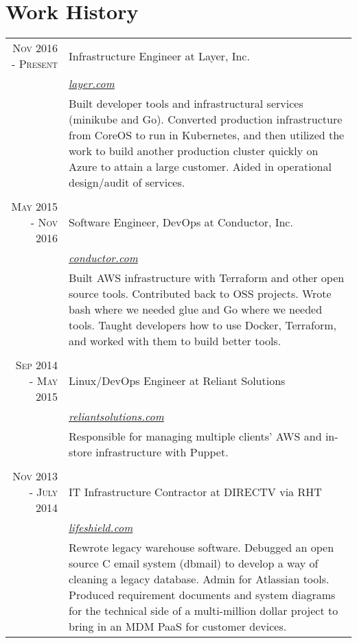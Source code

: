 \documentclass[a4paper, 10pt, onepage]{article} %
\begin{document}
\section{Work History}
\begin{tabular}{r|p{10cm}}
\textsc{Nov 2016 - Present} & {Infrastructure Engineer at Layer, Inc.}\\
&\small\emph{\href{https://layer.com}{layer.com}}\\
&\footnotesize{Built developer tools and infrastructural services (minikube and Go). Converted production infrastructure from CoreOS to run in Kubernetes, and then utilized the work to build another production cluster quickly on Azure to attain a large customer. Aided in operational design/audit of services.}\\

\multicolumn{2}{c}{}\\
\textsc{May 2015 - Nov 2016} & {Software Engineer, DevOps at Conductor, Inc.}\\
&\small\emph{\href{https://conductor.com}{conductor.com}}\\
&\footnotesize{Built AWS infrastructure with Terraform and other open source tools. Contributed back to OSS projects. Wrote bash where we needed glue and Go where we needed tools. Taught developers how to use Docker, Terraform, and worked with them to build better tools.}\\

\multicolumn{2}{c}{}\\
\textsc{Sep 2014 - May 2015} & {Linux/DevOps Engineer at Reliant Solutions}\\
&\small\emph{\href{https://reliantsolutions.com}{reliantsolutions.com}}\\
&\footnotesize{Responsible for managing multiple clients' AWS and in-store infrastructure with Puppet.}\\

\multicolumn{2}{c}{}\\
\textsc{Nov 2013 - July 2014} & {IT Infrastructure Contractor at DIRECTV via RHT}\\
&\small\emph{\href{https://lifeshield.com}{lifeshield.com}}\\
&\footnotesize{Rewrote legacy warehouse software. Debugged an open source C email system (dbmail) to develop a way of cleaning a legacy database. Admin for Atlassian tools. Produced requirement documents and system diagrams for the technical side of a multi-million dollar project to bring in an MDM PaaS for customer devices.}\\


\end{tabular}
\end{document}
